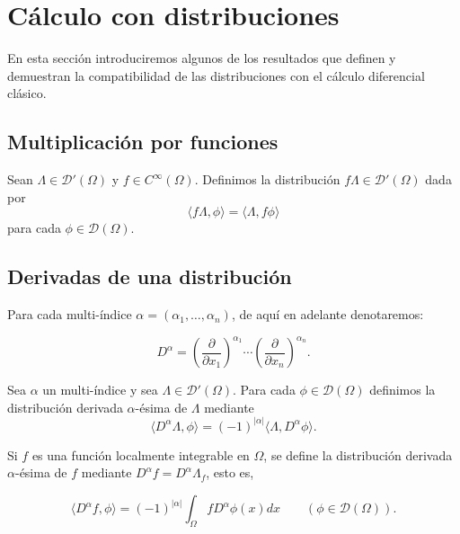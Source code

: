 \section{Cálculo con distribuciones}

En esta sección introduciremos algunos de los resultados que definen y demuestran la compatibilidad de las distribuciones con el cálculo diferencial clásico. 
\subsection{Multiplicación por funciones}

\begin{definicion}
Sean $\Lambda\in \mathcal{D}'(\Omega)$ y $f\in C^{\infty}(\Omega)$. Definimos la distribución $f\Lambda\in\mathcal{D}'(\Omega)$ dada por
\begin{equation}
\langle f\Lambda,\phi\rangle = \langle \Lambda , f\phi\rangle
\end{equation}
para cada $\phi\in \mathcal{D}(\Omega) $.
\end{definicion}

\subsection{Derivadas de una distribución}
\begin{definicion}
Para cada multi-índice $\alpha = (\alpha_1,\ldots,\alpha_n)$, de aquí en adelante denotaremos:

\begin{equation}
D^{\alpha} = \left( \frac{\partial}{\partial x_{1}}\right)^{\alpha_{1}} \cdots \left(\frac{\partial}{\partial x_{n}} \right)^{\alpha_{n}}.
\end{equation}
\end{definicion}

\begin{definicion}
Sea $\alpha$ un multi-índice y sea $\Lambda\in\mathcal{D}'(\Omega)
$. Para cada $\phi\in\mathcal{D}(\Omega)$ definimos la distribución derivada $\alpha$-ésima de $\Lambda$ mediante
\begin{equation}
\langle D^{\alpha}\Lambda,\phi\rangle = (-1)^{\vert\alpha\vert}\langle \Lambda,D^{\alpha}\phi\rangle.
\end{equation}
\end{definicion}

\begin{definicion}

Si $f$ es una función localmente integrable en $\Omega$, se define la distribución derivada $\alpha$-ésima
de $f$ mediante $D^{\alpha}f=D^{\alpha}\Lambda_{f}$, esto es,

\begin{equation}
\langle D^{\alpha}f, \phi \rangle = (-1)^{\vert \alpha \vert} \int_{\Omega} f D^{\alpha} \phi (x)dx \qquad (\phi\in \mathcal{D}(\Omega)).
\end{equation}
\end{definicion}

